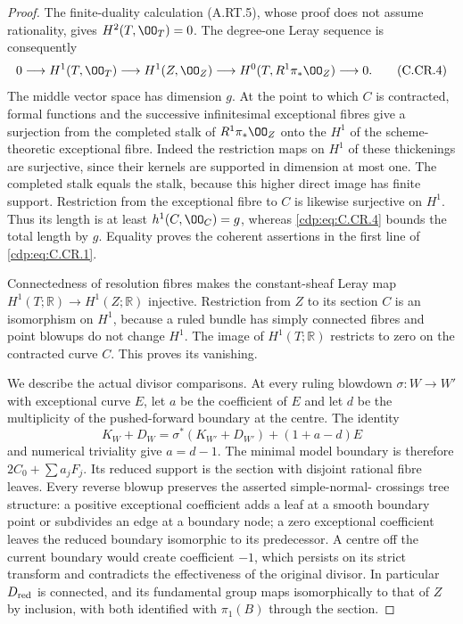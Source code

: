 \begin{proof}
The finite-duality calculation (A.RT.5), whose proof does
not assume rationality, gives $H^2(T,\OO_T)=0$. The
degree-one Leray sequence is consequently
\[
 0\longrightarrow H^1(T,\OO_T)\longrightarrow H^1(Z,\OO_Z)
 \longrightarrow H^0(T,R^1\pi_*\OO_Z)\longrightarrow0.
\tag{C.CR.4}\label{cdp:eq:C.CR.4}
\]
The middle vector space has dimension $g$. At the point
to which $C$ is contracted, formal functions and the
successive infinitesimal exceptional fibres give a
surjection from the completed stalk of $R^1\pi_*\OO_Z$
onto the $H^1$ of the scheme-theoretic exceptional fibre.
Indeed the restriction maps on $H^1$ of these thickenings
are surjective, since their kernels are supported in
dimension at most one. The completed stalk equals the
stalk, because this higher direct image has finite support.
Restriction from the exceptional fibre to $C$ is likewise
surjective on $H^1$. Thus its length is at least
$h^1(C,\OO_C)=g$, whereas \eqref{cdp:eq:C.CR.4} bounds the total length
by $g$. Equality proves the coherent assertions in the
first line of \eqref{cdp:eq:C.CR.1}.

Connectedness of resolution fibres makes the constant-sheaf
Leray map $H^1(T;\mathbb R)\to H^1(Z;\mathbb R)$ injective.
Restriction from $Z$ to its section $C$ is an isomorphism
on $H^1$, because a ruled bundle has simply connected
fibres and point blowups do not change $H^1$. The image of
$H^1(T;\mathbb R)$ restricts to zero on the contracted
curve $C$. This proves its vanishing.

We describe the actual divisor comparisons. At every ruling
blowdown $\sigma:W\to W'$ with exceptional curve $E$, let
$a$ be the coefficient of $E$ and let $d$ be the multiplicity
of the pushed-forward boundary at the centre. The identity
\[
 K_W+D_W=\sigma^*(K_{W'}+D_{W'})+(1+a-d)E
\tag{C.CR.5}\label{cdp:eq:C.CR.5}
\]
and numerical triviality give $a=d-1$. The minimal model
boundary is therefore $2C_0+\sum a_jF_j$. Its reduced
support is the section with disjoint rational fibre leaves.
Every reverse blowup preserves the asserted simple-normal-
crossings tree structure: a positive exceptional coefficient
adds a leaf at a smooth boundary point or subdivides an edge
at a boundary node; a zero exceptional coefficient leaves
the reduced boundary isomorphic to its predecessor. A centre
off the current boundary would create coefficient $-1$,
which persists on its strict transform and contradicts the
effectiveness of the original divisor. In particular
$D_{\rm red}$ is connected, and its fundamental group maps
isomorphically to that of $Z$ by inclusion, with both
identified with $\pi_1(B)$ through the section.


\end{proof}
